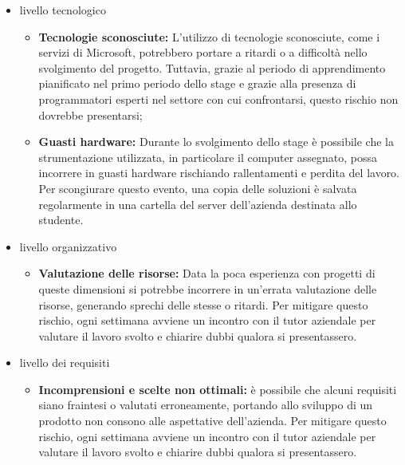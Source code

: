 \begin{itemize}
	\item livello tecnologico
	\begin{itemize}
		\item \textbf{Tecnologie sconosciute:} L'utilizzo di tecnologie sconosciute, come i servizi di Microsoft, potrebbero portare a ritardi o a difficoltà nello svolgimento del progetto. Tuttavia, grazie al periodo di apprendimento pianificato nel primo periodo dello stage e grazie alla presenza di programmatori esperti nel settore con cui confrontarsi, questo rischio non dovrebbe presentarsi;
		\item \textbf{Guasti hardware:} Durante lo svolgimento dello stage è possibile che la strumentazione utilizzata, in particolare il computer assegnato, possa incorrere in guasti hardware rischiando rallentamenti e perdita del lavoro. Per scongiurare questo evento, una copia delle soluzioni è salvata regolarmente in una cartella del server dell'azienda destinata allo studente.   
	\end{itemize}
	\item livello organizzativo
	\begin{itemize}
		\item \textbf{Valutazione delle risorse:} Data la poca esperienza con progetti di queste dimensioni si potrebbe incorrere in un'errata valutazione delle risorse, generando sprechi delle stesse o ritardi. Per mitigare questo rischio, ogni settimana avviene un incontro con il tutor aziendale per valutare il lavoro svolto e chiarire dubbi qualora si presentassero.
	\end{itemize}
	\item livello dei requisiti
	\begin{itemize}
		\item \textbf{Incomprensioni e scelte non ottimali:} è possibile che alcuni requisiti siano fraintesi o valutati erroneamente, portando allo sviluppo di un prodotto non consono alle aspettative dell'azienda. Per mitigare questo rischio, ogni settimana avviene un incontro con il tutor aziendale per valutare il lavoro svolto e chiarire dubbi qualora si presentassero.
	\end{itemize}
\end{itemize}

